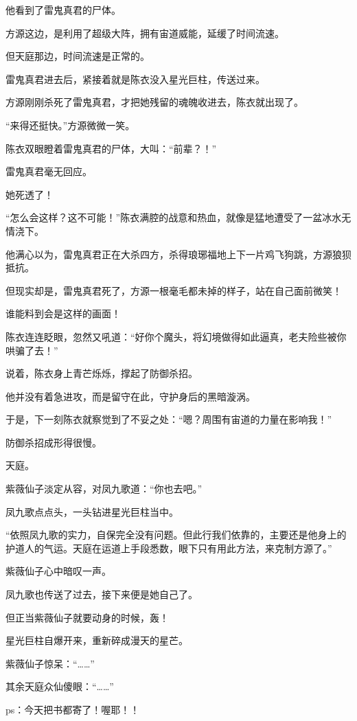 \begin{this_body}
他看到了雷鬼真君的尸体。

方源这边，是利用了超级大阵，拥有宙道威能，延缓了时间流速。

但天庭那边，时间流速是正常的。

雷鬼真君进去后，紧接着就是陈衣没入星光巨柱，传送过来。

方源刚刚杀死了雷鬼真君，才把她残留的魂魄收进去，陈衣就出现了。

“来得还挺快。”方源微微一笑。

陈衣双眼瞪着雷鬼真君的尸体，大叫：“前辈？！”

雷鬼真君毫无回应。

她死透了！

“怎么会这样？这不可能！”陈衣满腔的战意和热血，就像是猛地遭受了一盆冰水无情浇下。

他满心以为，雷鬼真君正在大杀四方，杀得琅琊福地上下一片鸡飞狗跳，方源狼狈抵抗。

但现实却是，雷鬼真君死了，方源一根毫毛都未掉的样子，站在自己面前微笑！

谁能料到会是这样的画面！

陈衣连连眨眼，忽然又吼道：“好你个魔头，将幻境做得如此逼真，老夫险些被你哄骗了去！”

说着，陈衣身上青芒烁烁，撑起了防御杀招。

他并没有着急进攻，而是留守在此，守护身后的黑暗漩涡。

于是，下一刻陈衣就察觉到了不妥之处：“嗯？周围有宙道的力量在影响我！”

防御杀招成形得很慢。

天庭。

紫薇仙子淡定从容，对凤九歌道：“你也去吧。”

凤九歌点点头，一头钻进星光巨柱当中。

“依照凤九歌的实力，自保完全没有问题。但此行我们依靠的，主要还是他身上的护道人的气运。天庭在运道上手段悉数，眼下只有用此方法，来克制方源了。”

紫薇仙子心中暗叹一声。

凤九歌也传送了过去，接下来便是她自己了。

但正当紫薇仙子就要动身的时候，轰！

星光巨柱自爆开来，重新碎成漫天的星芒。

紫薇仙子惊呆：“……”

其余天庭众仙傻眼：“……”

ps：今天把书都寄了！喔耶！！

\end{this_body}

